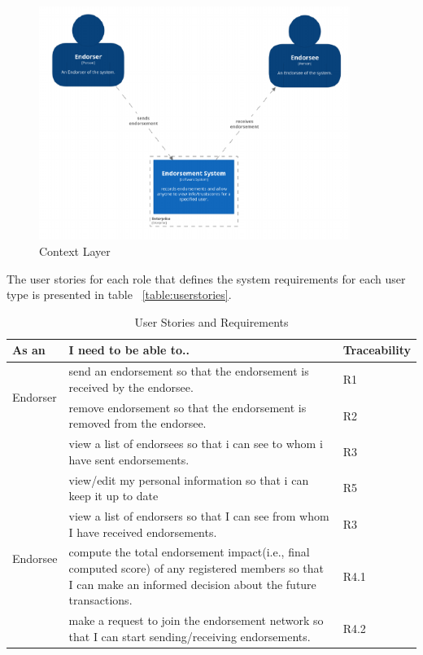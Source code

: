 \begin{figure}
	\centering
	\includegraphics[width=0.9\textwidth]{Images/1SystemContext.eps}
	\caption{Context Layer}
	\label{fig:context}
\end{figure}

The user stories for each role that defines the system requirements for each
user type is presented in table ~\ref{table:userstories}. 
\begin{center} \label{table:userstories} 
	\begin{table}
	\begin{tabular} {| l | p{8cm} | l |}
		\hline
		\textbf{As an}  & \textbf{I need to be able to..}   & \textbf{Traceability} \\
		\hline
		\multirow{2}{*}{Endorser} & send an endorsement so that the endorsement
		is received by the endorsee.& R1
		\\\cline{2-3} 
		& remove endorsement so that the endorsement is removed from the
		endorsee.  & R2 \\\cline{2-3}
		& view a list of endorsees so that i can see to whom i have sent
		endorsements.& R3 \\\cline{2-3}
		& view/edit my personal information so that i can keep it up to
		date& R5 \\\cline{2-3}
		\hline
		\multirow{2}{*}{Endorsee} & view a list of endorsers so that I can see
		from whom I have received endorsements.& R3 \\\cline{2-3}
		\hline
		\multirow{2}{*}{other users} & compute the total endorsement
		impact(i.e., final computed score) of any registered members so that I
		can make an informed decision about the future transactions.
		& R4.1 \\\cline{2-3}
		& make a request to join the endorsement network so that I can start
		sending/receiving endorsements.  
		& R4.2 \\\cline{2-3}
		\hline
	\end{tabular}
	\caption{User Stories and Requirements}
\end{table}
\end{center}

